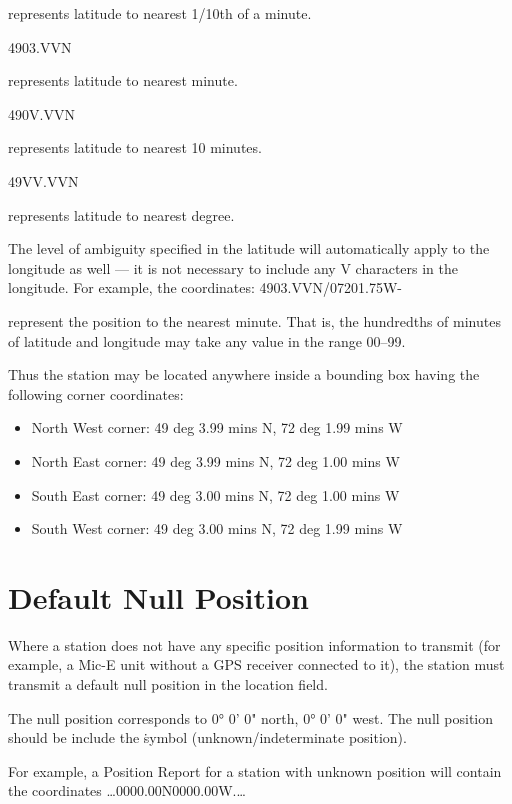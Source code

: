 represents latitude to nearest 1/10th of a minute.

4903.VVN

represents latitude to nearest minute.

490V.VVN

represents latitude to nearest 10 minutes.

49VV.VVN

represents latitude to nearest degree.

The level of ambiguity specified in the latitude will automatically apply to
the longitude as well — it is not necessary to include any V characters in the
longitude.
For example, the coordinates:
4903.VVN/07201.75W-

represent the position to the nearest minute. That is, the hundredths of
minutes of latitude and longitude may take any value in the range 00–99.




Thus the station may be located anywhere inside a bounding box having the
following corner coordinates:

\begin{itemize}

\item North West corner: 49 deg 3.99 mins N, 72 deg 1.99 mins W
\item North East corner: 49 deg 3.99 mins N, 72 deg 1.00 mins W
\item South East corner: 49 deg 3.00 mins N, 72 deg 1.00 mins W
\item South West corner: 49 deg 3.00 mins N, 72 deg 1.99 mins W

\end{itemize}


\section{Default Null Position}

Where a station does not have any specific position information to transmit
(for example, a Mic-E unit without a GPS receiver connected to it), the
station must transmit a default null position in the location field.

The null position corresponds to 0° 0' 0" north, 0° 0' 0" west.
The null position should be include the \. symbol (unknown/indeterminate
position).

For example, a Position Report for a station with unknown position
will contain the coordinates …0000.00N\00000.00W.…

